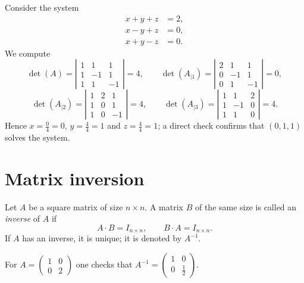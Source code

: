\begin{example}
Consider the system
\[
\begin{aligned}
x+y+z &= 2,\\ x-y+z &= 0,\\ x+y-z &= 0.
\end{aligned}
\]
We compute
\[
\det(A) = \left| \begin{array}{ccc} 1 & 1 & 1\\ 1 & -1 & 1\\ 1 & 1 & -1 \end{array} \right| = 4,
\qquad
\det(A_{|1}) = \left| \begin{array}{ccc} 2 & 1 & 1\\ 0 & -1 & 1\\ 0 & 1 & -1 \end{array} \right| = 0,
\]
\[
\det(A_{|2}) = \left| \begin{array}{ccc} 1 & 2 & 1\\ 1 & 0 & 1\\ 1 & 0 & -1 \end{array} \right| = 4,
\qquad
\det(A_{|3}) = \left| \begin{array}{ccc} 1 & 1 & 2\\ 1 & -1 & 0\\ 1 & 1 & 0 \end{array} \right| = 4.
\]
Hence $x = \tfrac04 = 0$, $y = \tfrac44 = 1$ and $z = \tfrac44 = 1$; a direct check confirms that $(0,1,1)$
solves the system.
\end{example}

\section{Matrix inversion}

\begin{definition}
Let $A$ be a square matrix of size $n\times n$. A matrix $B$ of the same size is called an \emph{inverse} of
$A$ if
\[
A\cdot B = I_{n\times n}, \qquad B\cdot A = I_{n\times n}.
\]
If $A$ has an inverse, it is unique; it is denoted by $A^{-1}$.
\end{definition}

\begin{example}
For $A = \left ( \begin{smallmatrix} 1 & 0\\ 0 & 2 \end{smallmatrix} \right )$ one checks that
$A^{-1} = \left ( \begin{smallmatrix} 1 & 0\\ 0 & \tfrac12 \end{smallmatrix} \right )$.
\end{example}

